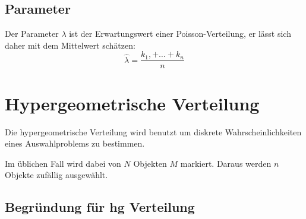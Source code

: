 \documentclass[../Main.tex]{subfiles}
\begin{document}

\subsection{Parameter}
Der Parameter \(\lambda\) ist der Erwartungswert einer Poisson-Verteilung, er lässt sich daher mit dem
Mittelwert schätzen:
\begin{equation}
    \hat{\lambda} = \frac{k_1, + \dots + k_n}{n}
\end{equation}

\newpage
\section{Hypergeometrische Verteilung}
Die hypergeometrische Verteilung wird benutzt um
diskrete Wahrscheinlichkeiten eines Auswahlproblems zu bestimmen.

Im üblichen Fall wird dabei von \(N\) Objekten \(M\) markiert.
Daraus werden \(n\) Objekte zufällig ausgewählt.



\subsection{Begründung für hg Verteilung}
    
\end{document}
